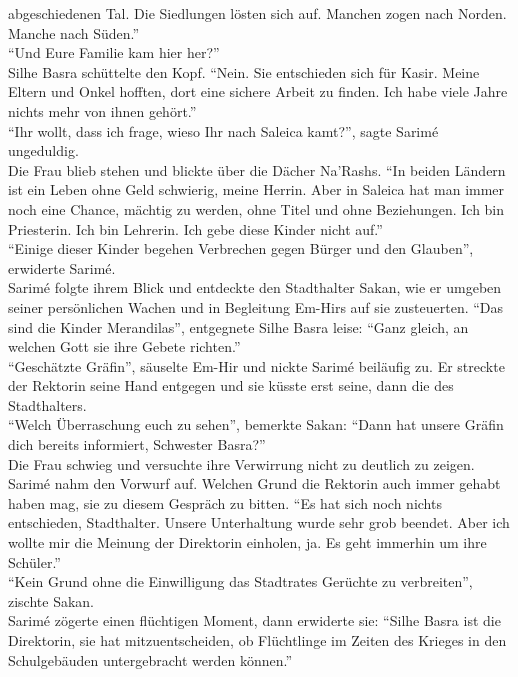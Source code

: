 abgeschiedenen Tal. Die Siedlungen lösten sich auf. Manchen zogen nach Norden. Manche nach 
Süden.''\\
``Und Eure Familie kam hier her?''\\
Silhe Basra schüttelte den Kopf. ``Nein. Sie entschieden sich für Kasir. Meine Eltern und Onkel 
hofften, dort eine sichere Arbeit zu finden. Ich habe viele Jahre nichts mehr von ihnen gehört.''\\
``Ihr wollt, dass ich frage, wieso Ihr nach Saleica kamt?'', sagte Sarimé ungeduldig.\\
Die Frau blieb stehen und blickte über die Dächer Na'Rashs. ``In beiden Ländern ist ein Leben ohne 
Geld schwierig, meine Herrin. Aber in Saleica hat man immer noch eine Chance, mächtig zu werden, 
ohne Titel und ohne Beziehungen. Ich bin Priesterin. Ich bin Lehrerin. Ich gebe diese Kinder nicht 
auf.''\\
``Einige dieser Kinder begehen Verbrechen gegen Bürger und den Glauben'', erwiderte Sarimé.\\
Sarimé folgte ihrem Blick und entdeckte den Stadthalter Sakan, wie er umgeben seiner persönlichen 
Wachen und in Begleitung Em-Hirs auf sie zusteuerten. ``Das sind die Kinder Merandilas'', 
entgegnete Silhe Basra leise: ``Ganz gleich, an welchen Gott sie ihre Gebete richten.''\\
``Geschätzte Gräfin'', säuselte Em-Hir und nickte Sarimé beiläufig zu. Er streckte der Rektorin 
seine Hand entgegen und sie küsste erst seine, dann die des Stadthalters.\\
``Welch Überraschung euch zu sehen'', bemerkte Sakan: ``Dann hat unsere Gräfin dich bereits 
informiert, Schwester Basra?''\\
Die Frau schwieg und versuchte ihre Verwirrung nicht zu deutlich zu zeigen.\\
Sarimé nahm den Vorwurf auf. Welchen Grund die Rektorin auch immer gehabt haben mag, sie zu diesem 
Gespräch zu bitten. ``Es hat sich noch nichts entschieden, Stadthalter. Unsere Unterhaltung wurde 
sehr grob beendet. Aber ich wollte mir die Meinung der Direktorin einholen, ja. Es geht immerhin um 
ihre Schüler.''\\
``Kein Grund ohne die Einwilligung das Stadtrates Gerüchte zu verbreiten'', zischte Sakan.\\
Sarimé zögerte einen flüchtigen Moment, dann erwiderte sie: ``Silhe Basra ist die Direktorin, sie 
hat mitzuentscheiden, ob Flüchtlinge im Zeiten des Krieges in den Schulgebäuden untergebracht 
werden können.''\\
